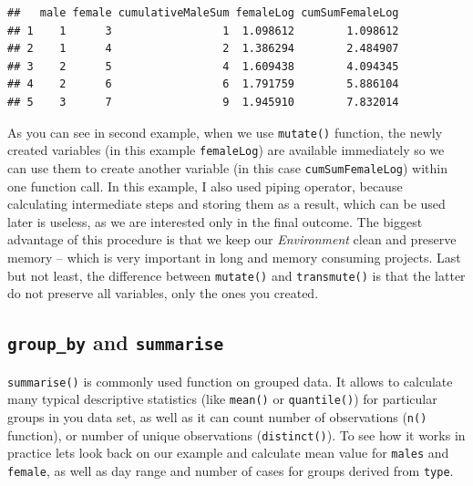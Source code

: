 \documentclass[]{book}
\newenvironment{Shaded}{\begin{snugshade}}{\end{snugshade}}
\newcommand{\KeywordTok}[1]{\textcolor[rgb]{0.13,0.29,0.53}{\textbf{#1}}}
\newcommand{\DataTypeTok}[1]{\textcolor[rgb]{0.13,0.29,0.53}{#1}}
\newcommand{\DecValTok}[1]{\textcolor[rgb]{0.00,0.00,0.81}{#1}}
\newcommand{\StringTok}[1]{\textcolor[rgb]{0.31,0.60,0.02}{#1}}
\newcommand{\OperatorTok}[1]{\textcolor[rgb]{0.81,0.36,0.00}{\textbf{#1}}}
\newcommand{\NormalTok}[1]{#1}
\theoremstyle{definition}
\theoremstyle{definition}
\theoremstyle{definition}
\theoremstyle{remark}
\begin{document}
\begin{verbatim}
##   male female cumulativeMaleSum femaleLog cumSumFemaleLog
## 1    1      3                 1  1.098612        1.098612
## 2    1      4                 2  1.386294        2.484907
## 3    2      5                 4  1.609438        4.094345
## 4    2      6                 6  1.791759        5.886104
## 5    3      7                 9  1.945910        7.832014
\end{verbatim}

As you can see in second example, when we use \texttt{mutate()}
function, the newly created variables (in this example
\texttt{femaleLog}) are available immediately so we can use them to
create another variable (in this case \texttt{cumSumFemaleLog}) within
one function call. In this example, I also used piping operator, because
calculating intermediate steps and storing them as a result, which can
be used later is useless, as we are interested only in the final
outcome. The biggest advantage of this procedure is that we keep our
\emph{Environment} clean and preserve memory -- which is very important
in long and memory consuming projects. Last but not least, the
difference between \texttt{mutate()} and \texttt{transmute()} is that
the latter do not preserve all variables, only the ones you created.

\subsection{\texorpdfstring{\texttt{group\_by} and
\texttt{summarise}}{group\_by and summarise}}\label{group_by-and-summarise}

\texttt{summarise()} is commonly used function on grouped data. It
allows to calculate many typical descriptive statistics (like
\texttt{mean()} or \texttt{quantile()}) for particular groups in you
data set, as well as it can count number of observations (\texttt{n()}
function), or number of unique observations (\texttt{distinct()}). To
see how it works in practice lets look back on our example and calculate
mean value for \texttt{males} and \texttt{female}, as well as day range
and number of cases for groups derived from \texttt{type}.

\begin{Shaded}
\end{Shaded}
\end{document}
